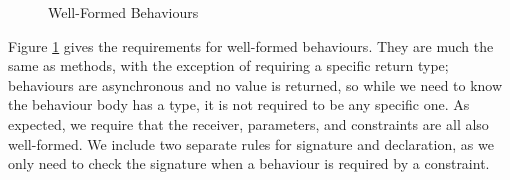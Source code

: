 \begin{figure}[H]
    \centering
    \begin{mathpar}
    
    
    \end{mathpar}
    \caption{Well-Formed Behaviours}
    \label{fig:degen-wfb}
\end{figure}

Figure \ref{fig:degen-wfb} gives the requirements for well-formed behaviours. They are much the same as methods, with the exception of requiring a specific return type; behaviours are asynchronous and no value is returned, so while we need to know the behaviour body has a type, it is not required to be any specific one. As expected, we require that the receiver, parameters, and constraints are all also well-formed. We include two separate rules for signature and declaration, as we only need to check the signature when a behaviour is required by a constraint.

